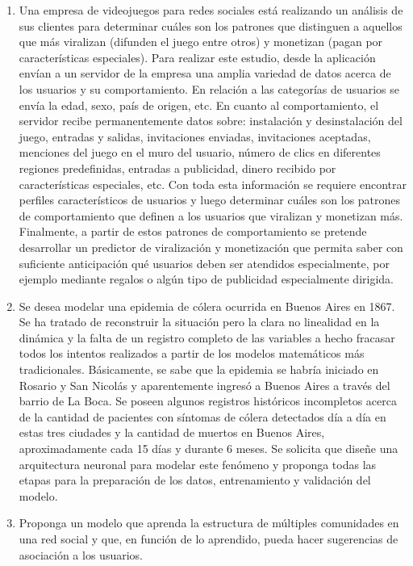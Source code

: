 \documentclass[a4paper,10pt,spanish,oneside]{article}
\begin{document}
\begin{enumerate}
\item Una empresa de videojuegos para redes sociales está realizando un análisis de sus clientes para determinar cuáles son los patrones que distinguen a aquellos que más viralizan (difunden el juego entre otros) y monetizan (pagan por características especiales). Para realizar este estudio, desde la aplicación envían a un servidor de la empresa una amplia variedad de datos acerca de los usuarios y su comportamiento. En relación a las categorías de usuarios se envía la edad, sexo, país de origen, etc. En cuanto al comportamiento, el servidor recibe permanentemente datos sobre: instalación y desinstalación del juego, entradas y salidas, invitaciones enviadas, invitaciones aceptadas, menciones del juego en el muro del usuario, número de clics en diferentes regiones predefinidas, entradas a publicidad, dinero recibido por características especiales, etc. Con toda esta información se requiere encontrar perfiles característicos de usuarios y luego determinar cuáles son los patrones de comportamiento que definen a los usuarios que viralizan y monetizan más. Finalmente, a partir de estos patrones de comportamiento se pretende desarrollar un predictor de viralización y monetización que permita saber con suficiente anticipación qué usuarios
deben ser atendidos especialmente, por ejemplo mediante regalos o algún tipo de publicidad especialmente dirigida.

\item Se desea modelar una epidemia de cólera ocurrida en Buenos Aires en 1867. Se ha tratado de reconstruir la situación pero la clara no linealidad en la dinámica y la falta de un registro completo de las variables a hecho fracasar todos los intentos realizados a partir de los modelos matemáticos más tradicionales. Básicamente, se sabe que la epidemia se habría iniciado en Rosario y San Nicolás y aparentemente ingresó a Buenos Aires a través del barrio de La Boca. Se poseen algunos registros históricos incompletos acerca de la cantidad de pacientes con síntomas de cólera detectados día a día en estas tres ciudades y la cantidad de muertos en Buenos Aires, aproximadamente cada 15 días y durante 6 meses. Se solicita que diseñe una arquitectura neuronal para modelar este fenómeno y proponga todas las etapas para la preparación de los datos, entrenamiento y validación del modelo.

\item Proponga un modelo que aprenda la estructura de múltiples comunidades en una red social y que, en función de lo aprendido, pueda hacer sugerencias de asociación a los usuarios.


\end{enumerate}
\end{document}
